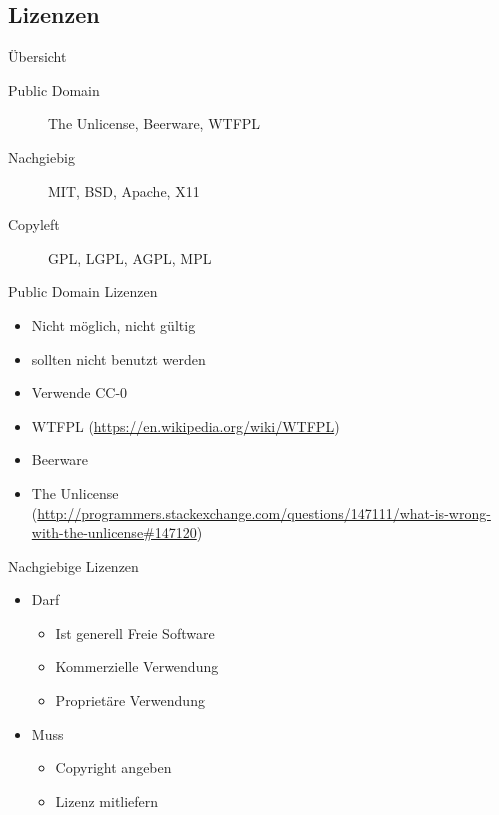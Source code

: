 \subsection{Lizenzen}
\subsectionframe

\begin{frame}{Übersicht}
	\begin{description}
		\item[Public Domain] The Unlicense, Beerware, WTFPL
		\item[Nachgiebig] MIT, BSD, Apache, X11
		\item[Copyleft] GPL, LGPL, AGPL, MPL
	\end{description}
\end{frame}

\begin{frame}{Public Domain Lizenzen}
	\begin{itemize}
		\item Nicht möglich, nicht gültig
		\item sollten nicht benutzt werden
		\item Verwende CC-0
	\end{itemize}
\end{frame}
\note
{
	\begin{itemize}
		\item WTFPL (\url{https://en.wikipedia.org/wiki/WTFPL})
		\item Beerware
		\item The Unlicense (\url{http://programmers.stackexchange.com/questions/147111/what-is-wrong-with-the-unlicense\#147120})
	\end{itemize}
}

\begin{frame}{Nachgiebige Lizenzen}
	\begin{itemize}
		\item Darf
		\begin{itemize}
			\item Ist generell Freie Software
			\item Kommerzielle Verwendung
			\item Proprietäre Verwendung
		\end{itemize}
		\item Muss
		\begin{itemize}
			\item Copyright angeben
			\item Lizenz mitliefern
		\end{itemize}
	\end{itemize}
\end{frame}

